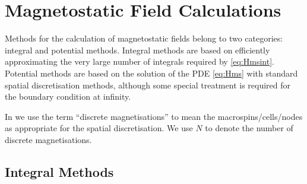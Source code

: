 \section{Magnetostatic Field Calculations}
\label{sec:magn-field-calc}

Methods for the calculation of magnetostatic fields belong to two categories: integral and potential methods.
Integral methods are based on efficiently approximating the very large number of integrals required by \cref{eq:Hmsint}.
Potential methods are based on the solution of the PDE \cref{eq:Hms} with standard spatial discretisation methods, although some special treatment is required for the boundary condition at infinity.

In  we use the term ``discrete magnetisations'' to mean the macrospins/cells/nodes as appropriate for the spatial discretisation.
We use $N$ to denote the number of discrete magnetisations.


\subsection{Integral Methods}
\label{sec:magstat-field-calc-inte}



